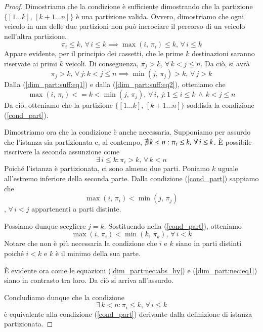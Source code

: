 \documentclass[../../../relazione.tex]{subfiles}
\begin{document}
\begin{proof}
    Dimostriamo che la condizione è sufficiente dimostrando che la partizione $\{[1\dots k],\, [k+1\dots n]\}$ è una partizione valida.
    Ovvero, dimostriamo che ogni veicolo in una delle due partizioni non può incrociare il percorso di un veicolo nell'altra partizione.
    \begin{equation}
        \label{dim_part:suff:eq1}
        \pi_i \leq k,\, \forall\, i \leq k \implies \max(i,\, \pi_i) \leq k,\, \forall\, i \leq k
    \end{equation}
    Appare evidente, per il principio dei cassetti, che le prime $k$ destinazioni saranno riservate ai primi $k$ veicoli.
    Di conseguenza,
    $\pi_j > k,\, \forall\, k < j \leq n$.
    Da ciò, si avrà
    \begin{equation}
        \label{dim_part:suff:eq2}
        \pi_j > k,\, \forall\, j :  k < j \leq n \implies \min(j,\, \pi_j) > k,\, \forall\, j > k
    \end{equation}
    Dalla (\ref{dim_part:suff:eq1}) e dalla (\ref{dim_part:suff:eq2}), otteniamo che
    \[ \max(i,\, \pi_i) <= k < \min(j,\, \pi_j),\, \forall\, i,\, j : 1 \leq i \leq k\,  \wedge\, k < j \leq n \]
    Da ciò, otteniamo che la partizione $\{[1\dots k],\, [k+1\dots n]\}$ soddisfa la condizione (\ref{cond_part}).

    Dimostriamo ora che la condizione è anche necessaria.
    Supponiamo per assurdo che l'istanza sia partizionata e, al contempo,
    $\not\exists\, k < n : \pi_i \leq k,\, \forall\, i \leq k$.
    È possibile riscrivere la seconda assunzione come
    \begin{equation}
        \label{dim_part:nec:abs_hy}
        \exists\, i \leq k : \pi_i > k,\, \forall\, k < n
    \end{equation}
    Poiché l'istanza è partizionata, ci sono almeno due parti.
    Poniamo $k$ uguale all'estremo inferiore della seconda parte.
    Dalla condizione (\ref{cond_part}) sappiamo che
    \[ \max(i,\, \pi_i) < \min(j,\, \pi_j) \]
    $,\, \forall\, i < j$ appartenenti a parti distinte.

    Possiamo dunque scegliere $j = k$.
    Sostituendo nella (\ref{cond_part}), otteniamo
    \begin{equation}
        \label{dim_part:nec:eq1}
        \max(i,\, \pi_i) < \min(k,\, \pi_k),\, \forall\, i < k
    \end{equation}
    Notare che non è più necessaria la condizione che $i$ e $k$ siano in parti distinti poiché $i < k$ e $k$ è il minimo della sua parte.

    È evidente ora come le equazioni (\ref{dim_part:nec:abs_hy}) e (\ref{dim_part:nec:eq1}) siano in contrasto tra loro.
    Da ciò si arriva all'assurdo.

    Concludiamo dunque che la condizione
    \begin{equation}\label{dim_part:cond_sempl}
        \exists\, k < n : \pi_i \leq k,\, \forall\, i \leq k
    \end{equation}
    è equivalente alla condizione (\ref{cond_part}) derivante dalla definizione di istanza partizionata.

\end{proof}
\end{document}
